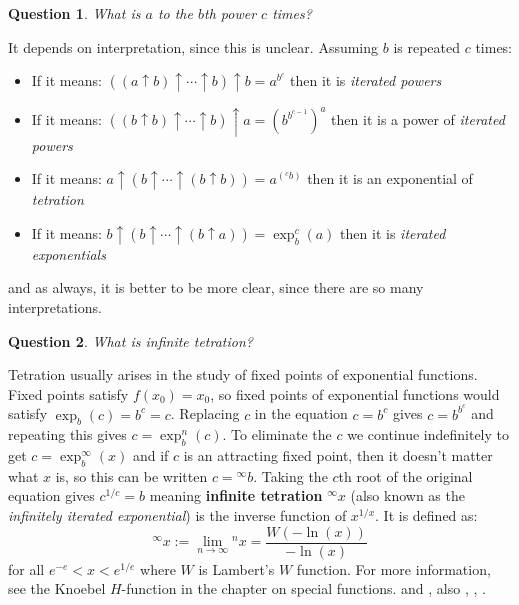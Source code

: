 \documentclass[12pt]{article}
\newtheorem{question}{Question}
\theoremstyle{definition}
\begin{document}
\begin{question}
What is $a$ to the $b$th power $c$ times?
\end{question}
It depends on interpretation, since this is unclear. Assuming $b$ is repeated $c$ times:
\begin{itemize}
\item If it means: $((a{\uparrow}b){\uparrow}{\cdots}{\uparrow}b){\uparrow}b = a^{b^c}$ then it is {\it iterated powers}
\item If it means: $((b{\uparrow}b){\uparrow}{\cdots}{\uparrow}b){\uparrow}a = (b^{b^{c-1}})^a$  then it is a power of {\it iterated powers}
\item If it means: $a{\uparrow}(b{\uparrow}{\cdots}{\uparrow}(b{\uparrow}b)) = a^{({}^{c}b)}$ then it is an exponential of {\it tetration}
\item If it means: $b{\uparrow}(b{\uparrow}{\cdots}{\uparrow}(b{\uparrow}a)) = \exp_b^c(a)$ then it is {\it iterated exponentials}
\end{itemize}
and as always, it is better to be more clear, since there are so many interpretations.



\begin{question}
What is infinite tetration?
\end{question}
Tetration usually arises in the study of fixed points of exponential functions. Fixed points satisfy $f(x_0) = x_0$, so fixed points of exponential functions would satisfy $\exp_b(c) = b^c = c$. Replacing $c$ in the equation $c = b^c$ gives $c = b^{b^c}$ and repeating this gives 
$c = \exp_b^{n}(c)$. To eliminate the $c$ we continue indefinitely to get $c = \exp_b^{\infty}(x)$ and if $c$ is an attracting fixed point, then it doesn't matter what $x$ is, so this can be written $c = {}^{\infty}b$. 
Taking the $c$th root of the original equation gives $c^{1/c} = b$ 
meaning {\bf infinite tetration} ${}^{\infty}x$ (also known as the {\it infinitely iterated exponential}) is the inverse function of $x^{1/x}$.  It is defined as:
\begin{equation}
{}^{\infty}x := \lim_{n\to\infty} {}^{n}x = \frac{W(-\ln(x))}{-\ln(x)}
\end{equation}
for all $e^{-e}<x<e^{1/e}$ where $W$ is Lambert's $W$ function. For more information, see the Knoebel $H$-function in the chapter on special functions. \cite{Euler:Exponentialibus} and
\cite{Knoebel:ExponentialsReiterated}, also \cite{Ash:TheLimit},
\cite{MacDonnell:SomeCriticalPoints}, \cite{Baker:ComplexIteration}.
\end{document}

